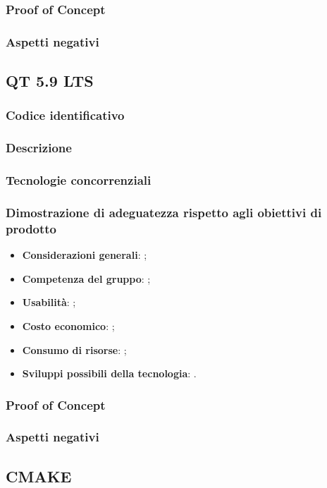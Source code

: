 \documentclass[./../Technology Baseline.tex]{subfiles}
\begin{document}
\subsubsection{Proof of Concept}
\subsubsection{Aspetti negativi}

\subsection{QT 5.9 LTS}

\subsubsection{Codice identificativo}
\subsubsection{Descrizione}
\subsubsection{Tecnologie concorrenziali}
\subsubsection{Dimostrazione di adeguatezza rispetto agli obiettivi di prodotto}
\begin{itemize}
	\item \textbf{Considerazioni generali}: ;
	\item \textbf{Competenza del gruppo}: ;
	\item \textbf{Usabilità}: ;
	\item \textbf{Costo economico}: ;
	\item \textbf{Consumo di risorse}: ;
	\item \textbf{Sviluppi possibili della tecnologia}: .
\end{itemize}
\subsubsection{Proof of Concept}
\subsubsection{Aspetti negativi}

\subsection{CMAKE}
\end{document}
